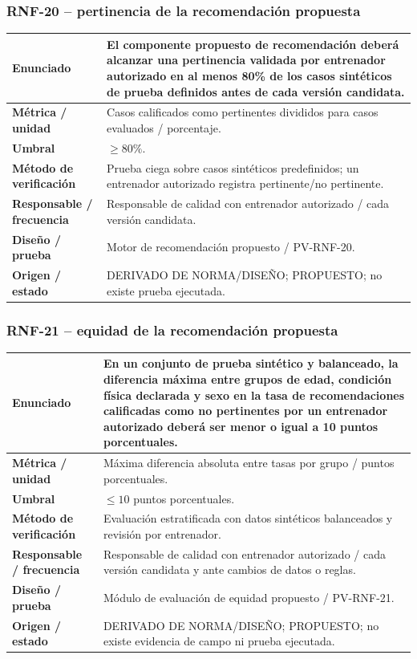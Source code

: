 \documentclass[11pt,a4paper,twoside]{article}
\begin{document}
\subsubsection{RNF-20 -- pertinencia de la recomendación propuesta}
\begin{tabularx}{\textwidth}{|>{\bfseries}p{4.0cm}|X|}\hline
Enunciado & El componente propuesto de recomendación deberá alcanzar una pertinencia validada por entrenador autorizado en al menos 80\% de los casos sintéticos de prueba definidos antes de cada versión candidata. \\ \hline
Métrica / unidad & Casos calificados como pertinentes divididos para casos evaluados / porcentaje. \\ \hline
Umbral & $\geq 80\%$. \\ \hline
Método de verificación & Prueba ciega sobre casos sintéticos predefinidos; un entrenador autorizado registra pertinente/no pertinente. \\ \hline
Responsable / frecuencia & Responsable de calidad con entrenador autorizado / cada versión candidata. \\ \hline
Diseño / prueba & Motor de recomendación propuesto / PV-RNF-20. \\ \hline
Origen / estado & DERIVADO DE NORMA/DISEÑO; PROPUESTO; no existe prueba ejecutada. \\ \hline
\end{tabularx}

\subsubsection{RNF-21 -- equidad de la recomendación propuesta}
\begin{tabularx}{\textwidth}{|>{\bfseries}p{4.0cm}|X|}\hline
Enunciado & En un conjunto de prueba sintético y balanceado, la diferencia máxima entre grupos de edad, condición física declarada y sexo en la tasa de recomendaciones calificadas como no pertinentes por un entrenador autorizado deberá ser menor o igual a 10 puntos porcentuales. \\ \hline
Métrica / unidad & Máxima diferencia absoluta entre tasas por grupo / puntos porcentuales. \\ \hline
Umbral & $\leq 10$ puntos porcentuales. \\ \hline
Método de verificación & Evaluación estratificada con datos sintéticos balanceados y revisión por entrenador. \\ \hline
Responsable / frecuencia & Responsable de calidad con entrenador autorizado / cada versión candidata y ante cambios de datos o reglas. \\ \hline
Diseño / prueba & Módulo de evaluación de equidad propuesto / PV-RNF-21. \\ \hline
Origen / estado & DERIVADO DE NORMA/DISEÑO; PROPUESTO; no existe evidencia de campo ni prueba ejecutada. \\ \hline
\end{tabularx}
\end{document}
